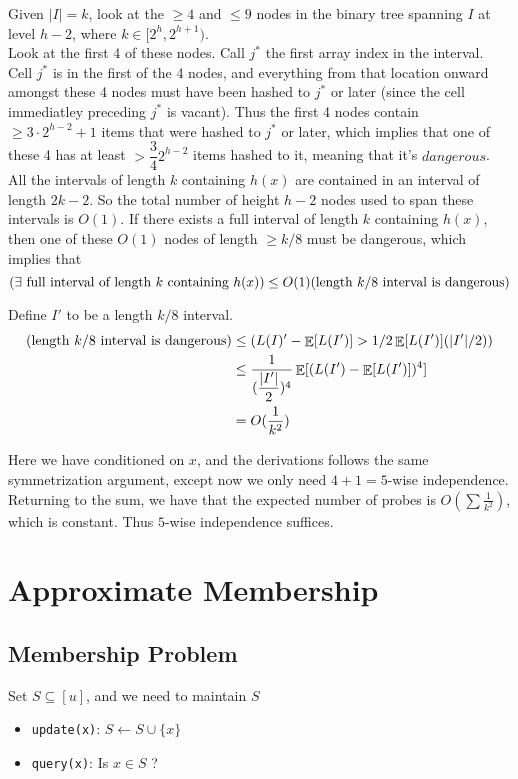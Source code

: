 \documentclass[11pt]{article}
\DeclareMathOperator*{\E}{\mathbb{E}}
\let\Pr\relax
\DeclareMathOperator*{\Pr}{\mathbb{P}}
\theoremstyle{definition}
\begin{document}
Given $|I| = k$, look at the $\geq 4$ and $\leq 9$ nodes in the binary tree spanning $I$ at level $h-2$, where $k \in [2^h, 2^{h+1})$.\\

Look at the first 4 of these nodes. Call $j^*$ the first array index in the interval. Cell $j^*$ is in the first of the 4 nodes, and everything from that location onward amongst these 4 nodes must have been hashed to $j^*$ or later (since the cell immediatley preceding $j^*$ is vacant). Thus the first 4 nodes contain $\geq 3 \cdot 2^{h-2} + 1$ items that were hashed to $j^*$ or later, which implies that one of these 4 has at least $> \dfrac{3}{4}2^{h-2}$ items hashed to it, meaning that it's $dangerous$.\\

All the intervals of length $k$ containing $h(x)$ are contained in an interval of length $2k-2$. So the total number of height $h-2$ nodes used to span these intervals is $O(1)$. If there exists a full interval of length $k$ containing $h(x)$, then one of these $O(1)$ nodes of length $\geq k/8$ must be dangerous, which implies that
\[\Pr(\exists \text{ full interval of length } k \text{ containing } h(x)) \leq O(1) \Pr(\text{length } k/8 \text{ interval is dangerous})\]

Define $I'$ to be a length $k/8$ interval.
\begin{align*}
\Pr( \text{length } k/8 \text{ interval is dangerous})
&\leq \Pr(L(I)' - \E[L(I')] > 1/2\E[L(I')] (|I'|/2))\\
&\leq \dfrac{1}{(\dfrac{|I'|}{2})^4} \E[(L(I') - \E[L(I')])^4]\\
&= O(\dfrac{1}{k^2})
\end{align*}

Here we have conditioned on $x$, and the derivations follows the same symmetrization argument,
except now we only need $4+1 = 5$-wise independence. Returning to the sum, we have that the expected number
of probes is $O(\sum \frac{1}{k^2})$, which is constant. Thus $5$-wise independence suffices.

\section{Approximate Membership}
\subsection{Membership Problem}
Set $S \subseteq [u]$, and we need to maintain $S$
\begin{itemize}
    \item \texttt{update(x)}: $S \leftarrow S \cup \{x\}$
    \item \texttt{query(x)}: Is $x \in S$ ?
\end{itemize}
\end{document}
